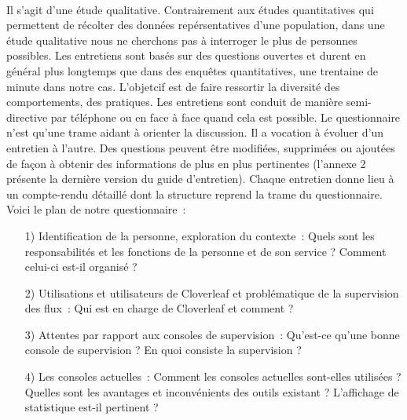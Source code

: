 			\paragraph{}%
			Il s'agit d'une étude qualitative. Contrairement aux études quantitatives qui
			permettent de récolter des données repérsentatives d'une population, dans une
			étude qualitative nous ne cherchons pas à interroger le plus de personnes
			possibles. Les entretiens sont basés sur des questions ouvertes et durent en
			général plus longtemps que dans des enquêtes quantitatives, une trentaine de
			minute dans notre cas.
			L'objetcif est de faire ressortir la diversité des comportements, des
			pratiques.\newline
			Les entretiens sont conduit de manière semi-directive par téléphone ou en face à
			face quand cela est possible.
			Le questionnaire n'est qu'une trame aidant à orienter la discussion. Il a
			vocation à évoluer d’un entretien à l'autre. Des questions peuvent être
			modifiées, supprimées ou ajoutées de façon à obtenir des informations de plus en
			plus pertinentes (l'annexe 2 présente la dernière version du guide d'entretien).
			Chaque entretien donne lieu à un compte-rendu détaillé dont la structure reprend
			la trame du
			questionnaire.\newline
			Voici le plan de notre questionnaire~:
			\begin{itemize}
			  \item[1) Identification de la personne, exploration du contexte~:] Quels
			  sont les responsabilités et les fonctions de la personne et de son service
			  ? Comment celui-ci est-il organisé ?
			  \item[2) Utilisations et utilisateurs de Cloverleaf et problématique de la
			  supervision des flux~:] Qui est en charge de Cloverleaf et comment ?
			  \item[3) Attentes par rapport aux consoles de supervision~:] Qu'est-ce
			  qu'une bonne console de supervision ? En quoi consiste la supervision ?
			  \item[4) Les consoles actuelles~:] Comment les consoles actuelles
			  sont-elles utilisées ? Quelles sont les avantages et inconvénients des
			  outils existant ? L'affichage de statistique est-il pertinent ?
			\end{itemize}
			

